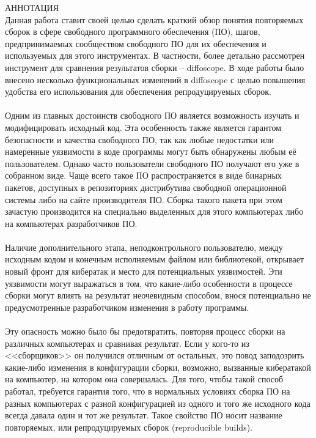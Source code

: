 {\centering
%
\SuperFont\MakeTextUppercase{Аннотация}\\
}
\vspace{32pt}
Данная работа ставит своей целью сделать краткий обзор понятия повторяемых сборок в сфере свободного программного обеспечения (ПО), шагов, предпринимаемых сообществом свободного ПО для их обеспечения и используемых для этого инструментах. В частности, более детально рассмотрен инструмент для сравнения результатов сборки -- diffoscope. В ходе работы было внесено несколько функциональных изменений в diffoscope с целью повышения удобства его использования для обеспечения репродуцируемых сборок.\\\\
Одним из главных достоинств свободного ПО является возможность изучать и модифицировать исходный код. Эта особенность также является гарантом безопасности и качества свободного ПО, так как любые недостатки или намеренные уязвимости в коде программы могут быть обнаружены любым её пользователем. Однако часто пользователи свободного ПО получают его уже в собранном виде. Чаще всего такое ПО распространяется в виде бинарных пакетов, доступных в репозиториях дистрибутива свободной операционной системы либо на сайте производителя ПО. Сборка такого пакета при этом зачастую производится на специально выделенных для этого компьютерах либо на компьютерах разработчиков ПО.\\\\
Наличие дополнительного этапа, неподконтрольного пользователю, между исходным кодом и конечным исполняемым файлом или библиотекой, открывает новый фронт для кибератак и место для потенциальных уязвимостей. Эти уязвимости могут выражаться в том, что какие-либо особенности в процессе сборки могут влиять на результат неочевидным способом, внося потенциально не предусмотренные разработчиком изменения в работу программы.\\\\
Эту опасность можно было бы предотвратить, повторяя процесс сборки на различных компьютерах и сравнивая результат. Если у кого-то из <<сборщиков>> он получился отличным от остальных, это повод заподозрить какие-либо изменения в конфигурации сборки, возможно, вызванные кибератакой на компьютер, на котором она совершалась. Для того, чтобы такой способ работал, требуется гарантия того, что в нормальных условиях сборка ПО на разных компьютерах с разной конфигурацией из одного и того же исходного кода всегда давала один и тот же результат. Такое свойство ПО носит название повторяемых, или репродуцируемых сборок (reproducible builds).\\\\

